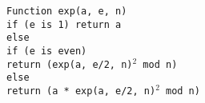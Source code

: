 \documentclass[twoside]{article}
\begin{document}
\texttt{Function exp(a, e, n)} \\
\hspace*{7mm} \texttt{if (e is 1) return a} \\
\hspace*{7mm} \texttt{else} \\
\hspace*{14mm} \texttt{if (e is even)} \\
\hspace*{21mm} \texttt{return (exp(a, e/2, n)$^2$ mod n)} \\
\hspace*{14mm} \texttt{else} \\
\hspace*{21mm} \texttt{return (a * exp(a, e/2, n)$^2$ mod n)} \\
\end{document}
